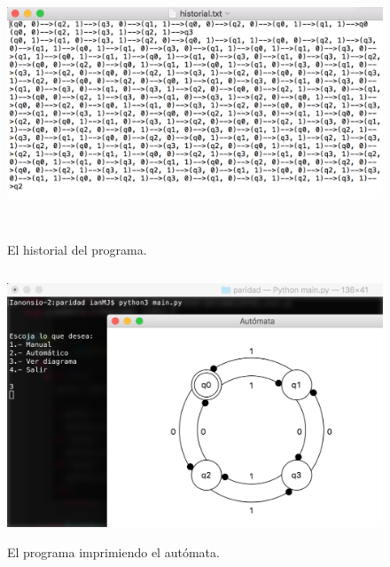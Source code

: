 \documentclass[12pt]{article}
\begin{document}
\begin{figure}[H]
\includegraphics[width=\textwidth, height=8cm]{paridad_historial}
\caption{El historial del programa.}
\label{fig:automata_ere_auto}
\end{figure}

\begin{figure}[H]
\includegraphics[width=\textwidth, height=8cm]{automata_paridad_prueba}
\caption{El programa imprimiendo el autómata.}
\label{fig:automata_paridad_prueba}
\end{figure}

\end{document}
